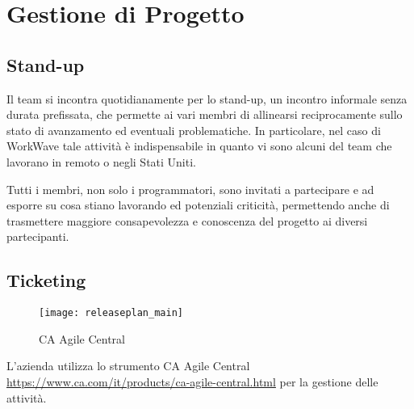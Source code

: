 \section{Gestione di Progetto}

\subsection{Stand-up}

Il team si incontra quotidianamente per lo stand-up, un incontro informale senza durata prefissata, che permette ai vari membri di allinearsi reciprocamente sullo stato di avanzamento ed eventuali problematiche. In particolare, nel caso di WorkWave tale attività è indispensabile in quanto vi sono alcuni del team che lavorano in remoto o negli Stati Uniti.

Tutti i membri, non solo i programmatori, sono invitati a partecipare e ad esporre su cosa stiano lavorando ed potenziali criticità, permettendo anche di trasmettere maggiore consapevolezza e conoscenza del progetto ai diversi partecipanti.

\subsection{Ticketing}

\begin{figure}[H] 
  \centering 
  \texttt{[image: releaseplan\_main]} 
  \caption{CA Agile Central}
\end{figure}

L'azienda utilizza lo strumento CA Agile Central \url{https://www.ca.com/it/products/ca-agile-central.html} per la gestione delle attività.
